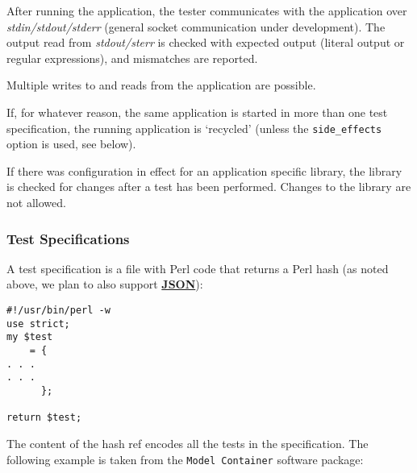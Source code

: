 \documentclass[12pt]{article}
\begin{document}
After running the application, the tester communicates with the application over {\it stdin/stdout/stderr} (general socket communication under development). The output read from {\it stdout/sterr} is checked with expected output (literal output or regular expressions), and mismatches are reported.

Multiple writes to and reads from the application are possible.

If, for whatever reason, the same application is started in more than one test specification, the running application is `recycled' (unless the {\tt side\_effects} option is used, see below).

If there was configuration in effect for an application specific library, the library is checked for changes after a test has been performed. Changes to the library are not allowed.

\subsubsection*{Test Specifications}

A test specification is a file with Perl code that returns a Perl hash (as noted above, we plan to also support \href{http://www.json.org/}{\bf JSON}):

\begin{verbatim}
#!/usr/bin/perl -w
use strict;
my $test
    = {
. . .
. . . 
      };

return $test;

\end{verbatim}
The content of the hash ref encodes all the tests in the specification. The following example is taken from the {\tt Model Container} software package:
\end{document}
